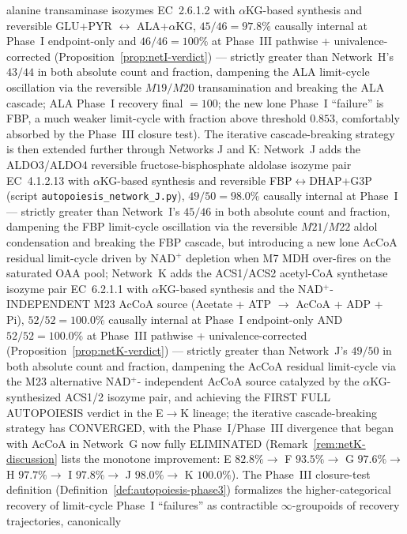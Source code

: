 \documentclass[11pt,a4paper]{article}
\theoremstyle{plain}
\theoremstyle{definition}
\theoremstyle{remark}
\begin{document}
alanine transaminase isozymes EC~2.6.1.2 with $\alpha$KG-based
synthesis and reversible GLU+PYR $\leftrightarrow$ ALA+$\alpha$KG,
$45/46 = 97.8\%$ causally internal at Phase~I endpoint-only and
$46/46 = 100\%$ at Phase~III pathwise + univalence-corrected
(Proposition~\ref{prop:netI-verdict}) --- strictly greater than
Network~H's $43/44$ in both absolute count and fraction, dampening the
ALA limit-cycle oscillation via the reversible $M19/M20$ transamination
and breaking the ALA cascade; ALA Phase~I recovery final $= 100$; the
new lone Phase~I ``failure'' is FBP, a much weaker limit-cycle with
fraction above threshold $0.853$, comfortably absorbed by the Phase~III
closure test). The iterative cascade-breaking strategy is then
extended further through Networks J and K: Network~J adds the
ALDO3/ALDO4 reversible fructose-bisphosphate aldolase isozyme pair
EC~4.1.2.13 with $\alpha$KG-based synthesis and reversible
FBP$\leftrightarrow$DHAP+G3P (script \texttt{autopoiesis\_network\_J.py}),
$49/50 = 98.0\%$ causally internal at Phase~I --- strictly greater
than Network~I's $45/46$ in both absolute count and fraction,
dampening the FBP limit-cycle oscillation via the reversible
$M21/M22$ aldol condensation and breaking the FBP cascade, but
introducing a new lone AcCoA residual limit-cycle driven by
NAD$^+$ depletion when M7 MDH over-fires on the saturated OAA pool;
Network~K adds the ACS1/ACS2 acetyl-CoA synthetase isozyme pair
EC~6.2.1.1 with $\alpha$KG-based synthesis and the
NAD$^+$-INDEPENDENT M23 AcCoA source (Acetate + ATP $\to$ AcCoA +
ADP + Pi), $52/52 = 100.0\%$ causally internal at Phase~I endpoint-only
AND $52/52 = 100.0\%$ at Phase~III pathwise + univalence-corrected
(Proposition~\ref{prop:netK-verdict}) --- strictly greater than
Network~J's $49/50$ in both absolute count and fraction, dampening
the AcCoA residual limit-cycle via the M23 alternative NAD$^+$-
independent AcCoA source catalyzed by the $\alpha$KG-synthesized
ACS1/2 isozyme pair, and achieving the FIRST FULL AUTOPOIESIS verdict
in the E$\to$K lineage; the iterative cascade-breaking strategy has
CONVERGED, with the Phase~I/Phase~III divergence that began with
AcCoA in Network~G now fully ELIMINATED
(Remark~\ref{rem:netK-discussion} lists the monotone improvement:
E $82.8\% \to$ F $93.5\% \to$ G $97.6\% \to$ H $97.7\% \to$
I $97.8\% \to$ J $98.0\% \to$ K $100.0\%$). The Phase~III closure-test
definition (Definition~\ref{def:autopoiesis-phase3}) formalizes the
higher-categorical recovery of limit-cycle Phase~I ``failures'' as
contractible $\infty$-groupoids of recovery trajectories, canonically
\end{document}
